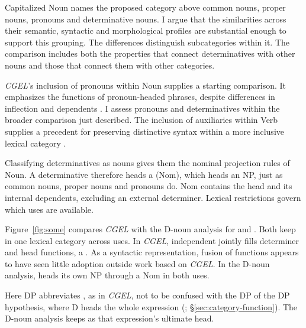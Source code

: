 \documentclass[12pt]{article}
\begin{document}
Capitalized Noun names the proposed category above common nouns, proper nouns, pronouns and determinative nouns. I argue that the similarities across their semantic, syntactic and morphological profiles are substantial enough to support this grouping. The differences distinguish subcategories within it. The comparison includes both the properties that connect determinatives with other nouns and those that connect them with other categories.

\textit{CGEL}'s inclusion of pronouns within Noun supplies a starting comparison. It emphasizes the functions of pronoun-headed phrases, despite differences in inflection and dependents \citep[327--328]{huddleston2002}. I assess pronouns and determinatives within the broader comparison just described. The inclusion of auxiliaries within Verb supplies a precedent for preserving distinctive syntax within a more inclusive lexical category \citep{pullumwilson1977}.

Classifying determinatives as nouns gives them the nominal projection rules of Noun. A determinative therefore heads a  (Nom), which heads an NP, just as common nouns, proper nouns and pronouns do. Nom contains the head and its internal dependents, excluding an external determiner. Lexical restrictions govern which uses are available.

Figure~\ref{fig:some} compares \textit{CGEL} with the D-noun analysis for  and . Both keep  in one lexical category across uses. In \textit{CGEL}, independent  jointly fills determiner and head functions, a  \citep[410--412]{huddleston2002}. As a syntactic representation, fusion of functions appears to have seen little adoption outside work based on \textit{CGEL}. In the D-noun analysis,  heads its own NP through a Nom in both uses.

Here DP abbreviates , as in \textit{CGEL}, not to be confused with the DP of the DP hypothesis, where D heads the whole expression  (\citealp{abney1987}; §\ref{sec:category-function}). The D-noun analysis keeps  as that expression's ultimate head.
\end{document}
